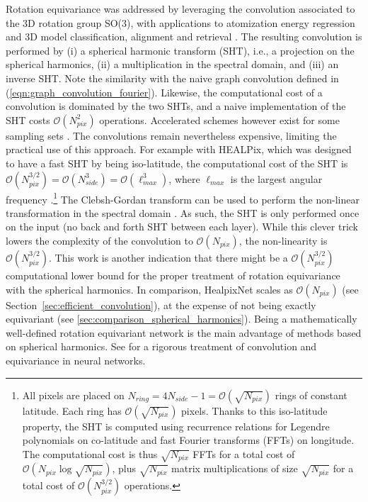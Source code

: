 \documentclass[final,twocolumn,3p,times,sort&compress]{elsarticle}
\newcommand{\secref}[1]{Section~\ref{sec:#1}}
\newcommand{\eqnref}[1]{(\ref{eqn:#1})}
\newcommand{\1}{\b{1}}              %
\newcommand{\0}{\b{0}}              %
\newcommand{\bO}{\mathcal{O}}
\begin{document}

Rotation equivariance was addressed by leveraging the convolution associated to the 3D rotation group SO(3), with applications to atomization energy regression and 3D model classification, alignment and retrieval \citep{cohen2018sphericalcnn,esteves2017sphericalcnn}.
The resulting convolution is performed by (i) a spherical harmonic transform (SHT), i.e., a projection on the spherical harmonics, (ii) a  multiplication in the spectral domain, and (iii) an inverse SHT.
Note the similarity with the naive graph convolution defined in \eqnref{graph_convolution_fourier}.
Likewise, the computational cost of a convolution is dominated by the two SHTs, and a naive implementation of the SHT costs $\bO(N_{pix}^2)$ operations.
Accelerated schemes however exist for some sampling sets \citep[see][for examples]{mohlenkamp1999fast, rokhlin2006fast, reinecke2013libsharp}.
The convolutions remain nevertheless expensive, limiting the practical use of this approach.
For example with HEALPix, which was designed to have a fast SHT by being iso-latitude, the computational cost of the SHT is $\bO(N_{pix}^{3/2}) = \bO(N_{side}^3) = \bO(\ell_{max}^3)$, where $\ell_{max}$ is the largest angular frequency \citep{gorski2005healpix, reinecke2013libsharp}.\footnote{All pixels are placed on $N_{ring} = 4N_{side}-1 = \bO\left(\sqrt{N_{pix}}\right)$ rings of constant latitude.
Each ring has $\bO\left(\sqrt{N_{pix}}\right)$ pixels.
Thanks to this iso-latitude property, the SHT is computed using recurrence relations for Legendre polynomials on co-latitude and fast Fourier transforms (FFTs) on longitude.
The computational cost is thus $\sqrt{N_{pix}}$ FFTs for a total cost of $\bO\left( N_{pix} \log \sqrt{N_{pix}} \right)$, plus $\sqrt{N_{pix}}$ matrix multiplications of size $\sqrt{N_{pix}}$ for a total cost of $\bO\left(N_{pix}^{3/2}\right)$ operations.}
The Clebsh-Gordan transform can be used to perform the non-linear transformation in the spectral domain \citep{kondor2018clebsch}.
As such, the SHT is only performed once on the input (no back and forth SHT between each layer).
While this clever trick lowers the complexity of the convolution to $\bO(N_{pix})$, the non-linearity is $\bO(N_{pix}^{3/2})$.
This work is another indication that there might be a $\bO(N_{pix}^{3/2})$ computational lower bound for the proper treatment of rotation equivariance with the spherical harmonics.
In comparison, HealpixNet scales as $\bO(N_{pix})$ (see \secref{efficient_convolution}), at the expense of not being exactly equivariant (see \ref{sec:comparison_spherical_harmonics}).
Being a mathematically well-defined rotation equivariant network is the main advantage of methods based on spherical harmonics.
See \citep{kondor2018equivariance} for a rigorous treatment of convolution and equivariance in neural networks.
\end{document}
